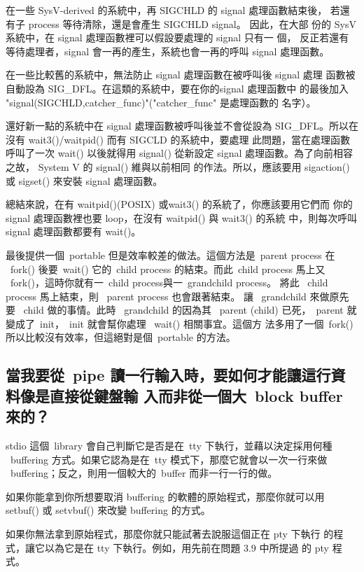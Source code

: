 \documentclass{article}
\begin{document}
\begin{CJK*}{Bg5}{ming}
	在一些 SysV-derived 的系統中，再 SIGCHLD 的 signal 處理函數結束後， 
	若還有子 process 等待清除，還是會產生 SIGCHLD signal。 因此，在大部
	份的 SysV 系統中，在 signal 處理函數裡可以假設要處理的 signal 只有一
	個， 反正若還有等待處理者，signal 會一再的產生，系統也會一再的呼叫 
	signal 處理函數。

	在一些比較舊的系統中，無法防止 signal 處理函數在被呼叫後 signal 處理
	函數被自動設為 SIG\_DFL。在這類的系統中，要在你的signal 處理函數中
	的最後加入 "signal(SIGCHLD,catcher\_func)"("catcher\_func" 是處理函數的
	名字）。

	還好新一點的系統中在 signal 處理函數被呼叫後並不會從設為 
	SIG\_DFL。所以在沒有 wait3()/waitpid() 而有 SIGCLD 的系統中，要處理
	此問題，當在處理函數呼叫了一次 wait() 以後就得用 signal() 從新設定 
	signal 處理函數。為了向前相容之故， System V 的 signal() 維與以前相同
	的作法。所以，應該要用 sigaction() 或 sigset() 來安裝 signal 處理函數。

	總結來說，在有 waitpid()(POSIX) 或wait3() 的系統了，你應該要用它們而
	你的 signal 處理函數裡也要 loop，在沒有 waitpid() 與 wait3() 的系統
	中，則每次呼叫 signal 處理函數都要有 wait()。

	最後提供一個~portable 但是效率較差的做法。這個方法是~parent process 在 
        ~fork() 後要~wait() 它的~child process 的結束。而此~child process 
	馬上又 ~fork()，這時你就有一~child process與一~grandchild process。
	將此 ~child process 馬上結束，則 ~parent process 也會跟著結束。
	讓 ~grandchild 來做原先要 ~child 做的事情。此時 ~grandchild 的因為其
	~parent (child) 已死，~parent 就變成了~init，~init 就會幫你處理 ~wait() 相關事宜。這個方
        法多用了一個~fork() 所以比較沒有效率，但這絕對是個~portable 的方法。 

\subsection{當我要從~pipe 讀一行輸入時，要如何才能讓這行資料像是直接從鍵盤輸
      入而非從一個大~block buffer 來的？}

	stdio 這個~library 會自己判斷它是否是在~tty 下執行，並藉以決定採用何種 
	~buffering 方式。如果它認為是在~tty 模式下，那麼它就會以一次一行來做 
	~buffering；反之，則用一個較大的~buffer 而非一行一行的做。

	如果你能拿到你所想要取消 buffering 的軟體的原始程式，那麼你就可以用 
	setbuf() 或 setvbuf() 來改變 buffering 的方式。

	如果你無法拿到原始程式，那麼你就只能試著去說服這個正在 pty 下執行
	的程式，讓它以為它是在 tty 下執行。例如，用先前在問題 3.9 中所提過
	的 pty 程式。


\end{CJK*}
\end{document}
